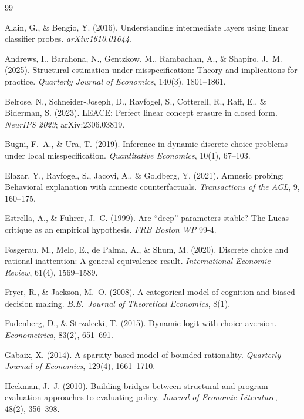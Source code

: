 \documentclass[11pt]{article}
\begin{document}
\begin{thebibliography}{99}\small

Alain, G., \& Bengio, Y. (2016). Understanding intermediate layers using
linear classifier probes. \emph{arXiv:1610.01644}.

Andrews, I., Barahona, N., Gentzkow, M., Rambachan, A., \& Shapiro, J.~M.
(2025). Structural estimation under misspecification: Theory and
implications for practice. \emph{Quarterly Journal of Economics}, 140(3),
1801--1861.

Belrose, N., Schneider-Joseph, D., Ravfogel, S., Cotterell, R., Raff, E.,
\& Biderman, S. (2023). LEACE: Perfect linear concept erasure in closed
form. \emph{NeurIPS 2023}; arXiv:2306.03819.

Bugni, F.~A., \& Ura, T. (2019). Inference in dynamic discrete choice
problems under local misspecification. \emph{Quantitative Economics},
10(1), 67--103.

Elazar, Y., Ravfogel, S., Jacovi, A., \& Goldberg, Y. (2021). Amnesic
probing: Behavioral explanation with amnesic counterfactuals.
\emph{Transactions of the ACL}, 9, 160--175.

Estrella, A., \& Fuhrer, J.~C. (1999). Are ``deep'' parameters stable? The
Lucas critique as an empirical hypothesis. \emph{FRB Boston WP} 99-4.

Fosgerau, M., Melo, E., de Palma, A., \& Shum, M. (2020). Discrete choice
and rational inattention: A general equivalence result.
\emph{International Economic Review}, 61(4), 1569--1589.

Fryer, R., \& Jackson, M.~O. (2008). A categorical model of cognition and
biased decision making. \emph{B.E.\ Journal of Theoretical Economics}, 8(1).

Fudenberg, D., \& Strzalecki, T. (2015). Dynamic logit with choice
aversion. \emph{Econometrica}, 83(2), 651--691.

Gabaix, X. (2014). A sparsity-based model of bounded rationality.
\emph{Quarterly Journal of Economics}, 129(4), 1661--1710.

Heckman, J.~J. (2010). Building bridges between structural and program
evaluation approaches to evaluating policy. \emph{Journal of Economic
Literature}, 48(2), 356--398.


\end{thebibliography}
\end{document}
